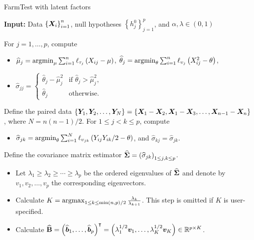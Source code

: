 \begin{algorithm}[!t]
\caption{FarmTest with latent factors \citep{FKSZ2017}} \label{alg2}
\hspace*{\algorithmicindent} \hspace{-0.6cm} \textbf{Input:} Data $\left\{\bm{X}_i\right\}_{i=1}^n$, null hypotheses $\left\{h^0_j\right\}_{j=1}^p$, and $\alpha, \lambda\in \left(0,1\right)$
\begin{algorithmic}[1]
\STATE For $j = 1, \ldots, p$, compute
\begin{itemize}
\item $\widehat{\mu}_j  =  \mathop{\mathrm{argmin}}_{ \mu  } \sum_{i=1}^n \ell_{\tau_j}\left( X_{ij}    -    \mu  \right) $,  $\widehat{\theta}_j  =  \mathop{\mathrm{argmin}}_{ \theta  } \sum_{i=1}^n \ell_{\upsilon_j }\left( X^2_{ij}    -    \theta  \right) $,
\item $\hat{\sigma}_{jj} =
  \begin{cases} \hat{\theta}_j-\hat{\mu}^2_j & \text{if }  \hat{\theta}_j >  \hat{\mu}^2_j, \\
   \hat{\theta}_j        & \text{otherwise}.
   \end{cases}$
 \end{itemize}
\STATE Define the paired data $\left\{ \bm{Y}_{1}, \bm{Y}_{2}, \ldots, \bm{Y}_{N} \right\}  = \left\{ \bm{X}_{1} - \bm{X}_{2}, \bm{X}_{1} - \bm{X}_{3}, \ldots, \bm{X}_{n-1} - \bm{X}_{n} \right\}$, where $N= n\left(n-1\right)/2$. For $1\leq j <  k\leq p$, compute
\begin{itemize}
\item $\widehat{\sigma}_{jk}=  \mathop{\mathrm{argmin}}_{ \theta  } \sum_{i=1}^N \ell_{\upsilon_{jk}}\left( Y_{ij} Y_{ik} / 2  -    \theta  \right) $, and $\hat \sigma_{kj} =\hat \sigma_{jk}$.
\end{itemize}
\STATE Define the covariance matrix estimator $\widehat{\bm{\Sigma}}= \left( \widehat{\sigma}_{jk}\right)_{1\leq j, k\leq p}$.
\begin{itemize}
\item Let $\lambda_1 \geq \lambda_2 \geq \cdots \geq  \lambda_p$ be the ordered eigenvalues of $\widehat{\bm{\Sigma}}$ and denote by $v_1, v_2,  \ldots, v_p$ the corresponding eigenvectors.
\item Calculate $K=\mathop{\mathrm{argmax}}_{1\leq k\leq \min\left(n,p\right)/2} \frac{\lambda_{k}}{\lambda_{k+1} }$. This step is omitted if $K$ is user-specified.
\item Calculate $\widehat{\mathbf{B}}  = \left(\widehat{\bm{b}}_1, \ldots, \widehat{\bm{b}}_p\right)^\intercal = \left(\lambda_1^{1/2}\bm{v}_1, \ldots, \lambda^{1/2}_K\bm{v}_K\right) \in \mathbb{R}^{p\times K}$.

\end{itemize}
\end{algorithmic}
\end{algorithm}
